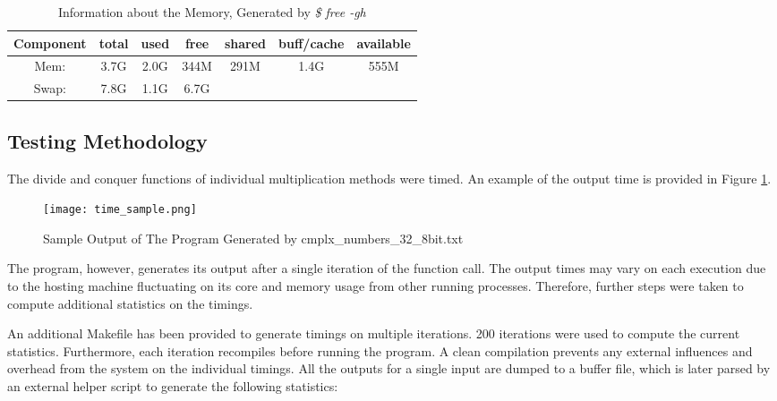 \documentclass[usletter, 12pt]{article}
\begin{document}
        \begin{table}[h]
            \caption{Information about the Memory, Generated by \textit{\$ free -gh}}
            \centering
            \begin{tabular*}{400pt}{@{\extracolsep{\fill}} ccccccc}

            \textbf{Component} & \textbf{total} & \textbf{used} & \textbf{free} & \textbf{shared} & \textbf{buff/cache} & \textbf{available} \\
            \hline
            Mem: & 3.7G & 2.0G & 344M & 291M & 1.4G & 555M \\
            Swap: & 7.8G & 1.1G & 6.7G & & & \\
            \end{tabular*}
        \end{table}


        \subsection{Testing Methodology}
        The divide and conquer functions of individual multiplication methods were timed. An example of the output time is provided in Figure \ref{time_sample}.

        \begin{figure}[ht]
            \begin{center}
                \texttt{[image: time\_sample.png]}
                \caption{Sample Output of The Program Generated by cmplx\_numbers\_32\_8bit.txt} \label{time_sample}
            \end{center}
        \end{figure}

        The program, however, generates its output after a single iteration of the function call. The output times may vary on each execution due to the hosting machine fluctuating on its core and memory usage from other running processes. Therefore, further steps were taken to compute additional statistics on the timings.

        An additional Makefile has been provided to generate timings on multiple iterations. 200 iterations were used to compute the current statistics. Furthermore, each iteration recompiles before running the program. A clean compilation prevents any external influences and overhead from the system on the individual timings. All the outputs for a single input are dumped to a buffer file, which is later parsed by an external helper script to generate the following statistics:
\end{document}
